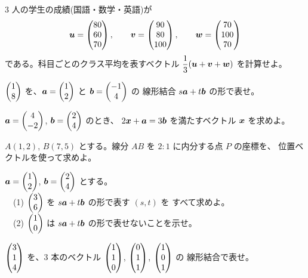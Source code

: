 \begin{mondai}[基本]\label{q:vec-ex4}
$3$ 人の学生の成績(国語・数学・英語)が
\[
\bm{u} = \begin{pmatrix}80 \\ 60 \\ 70\end{pmatrix}, \qquad
\bm{v} = \begin{pmatrix}90 \\ 80 \\ 100\end{pmatrix}, \qquad
\bm{w} = \begin{pmatrix}70 \\ 100 \\ 70\end{pmatrix}
\]
である。科目ごとのクラス平均を表すベクトル
$\dfrac{1}{3}(\bm{u} + \bm{v} + \bm{w})$ を計算せよ。
\end{mondai}

\begin{mondai}[標準]\label{q:vec-ex5}
$\begin{pmatrix}1 \\ 8\end{pmatrix}$ を、$\bm{a} = \begin{pmatrix}1 \\ 2\end{pmatrix}$ と $\bm{b} = \begin{pmatrix}-1 \\ 4\end{pmatrix}$ の
線形結合 $s\bm{a} + t\bm{b}$ の形で表せ。
\end{mondai}

\begin{mondai}[標準]\label{q:vec-ex6}
$\bm{a} = \begin{pmatrix}4 \\ -2\end{pmatrix}$, $\bm{b} = \begin{pmatrix}2 \\ 4\end{pmatrix}$ のとき、
$2\bm{x} + \bm{a} = 3\bm{b}$ を満たすベクトル $\bm{x}$ を求めよ。
\end{mondai}

\begin{mondai}[標準]\label{q:vec-ex7}
$A(1, 2)$, $B(7, 5)$ とする。線分 $AB$ を $2 : 1$ に内分する点 $P$ の座標を、
位置ベクトルを使って求めよ。
\end{mondai}

\begin{mondai}[標準]\label{q:vec-ex8}
$\bm{a} = \begin{pmatrix}1 \\ 2\end{pmatrix}$, $\bm{b} = \begin{pmatrix}2 \\ 4\end{pmatrix}$ とする。\\
　(1) $\begin{pmatrix}3 \\ 6\end{pmatrix}$ を $s\bm{a} + t\bm{b}$ の形で表す $(s, t)$ を
すべて求めよ。\\
　(2) $\begin{pmatrix}1 \\ 0\end{pmatrix}$ は $s\bm{a} + t\bm{b}$ の形で表せないことを示せ。
\end{mondai}

\begin{mondai}[発展]\label{q:vec-ex9}
$\begin{pmatrix}3 \\ 1 \\ 4\end{pmatrix}$ を、$3$ 本のベクトル
$\begin{pmatrix}1 \\ 1 \\ 0\end{pmatrix}$, $\begin{pmatrix}0 \\ 1 \\ 1\end{pmatrix}$, $\begin{pmatrix}1 \\ 0 \\ 1\end{pmatrix}$ の
線形結合で表せ。
\end{mondai}

